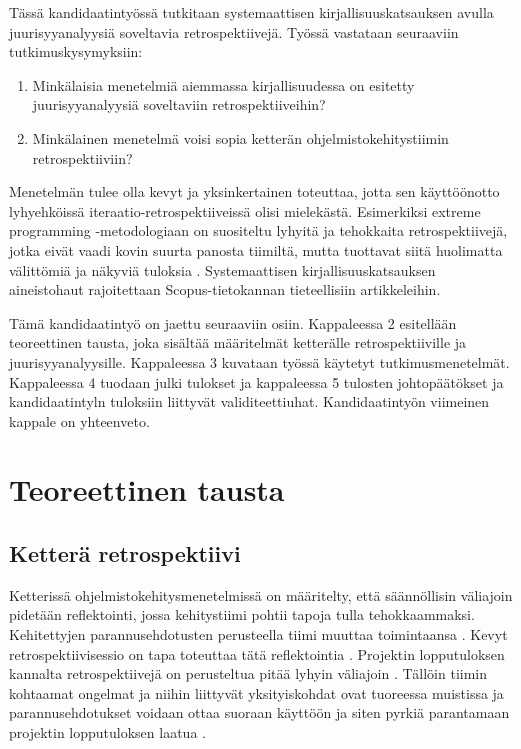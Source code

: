 Tässä kandidaatintyössä tutkitaan systemaattisen kirjallisuuskatsauksen \citep{Kitchenham2010} avulla juurisyyanalyysiä soveltavia retrospektiivejä. Työssä vastataan seuraaviin tutkimuskysymyksiin:
\begin{enumerate}
\item Minkälaisia menetelmiä aiemmassa kirjallisuudessa on esitetty juurisyyanalyysiä soveltaviin retrospektiiveihin?
\item Minkälainen menetelmä voisi sopia ketterän ohjelmistokehitystiimin retrospektiiviin?
\end{enumerate}
Menetelmän tulee olla kevyt ja yksinkertainen toteuttaa, jotta sen käyttöönotto lyhyehköissä iteraatio-retrospektiiveissä olisi mielekästä. Esimerkiksi extreme programming -metodologiaan on suositeltu lyhyitä ja tehokkaita retrospektiivejä, jotka eivät vaadi kovin suurta panosta tiimiltä, mutta tuottavat siitä huolimatta välittömiä ja näkyviä tuloksia \citep{myllyaho2004review}. Systemaattisen kirjallisuuskatsauksen aineistohaut rajoitettaan Scopus-tietokannan tieteellisiin artikkeleihin.

Tämä kandidaatintyö on jaettu seuraaviin osiin. Kappaleessa 2 esitellään teoreettinen tausta, joka sisältää määritelmät ketterälle retrospektiiville ja juurisyyanalyysille. Kappaleessa 3 kuvataan työssä käytetyt tutkimusmenetelmät. Kappaleessa 4 tuodaan julki tulokset ja kappaleessa 5 tulosten johtopäätökset ja kandidaatintyln tuloksiin liittyvät validiteettiuhat. Kandidaatintyön viimeinen kappale on yhteenveto.

\section{Teoreettinen tausta}

\subsection{Ketterä retrospektiivi}
Ketterissä ohjelmistokehitysmenetelmissä on määritelty, että säännöllisin väliajoin pidetään reflektointi, jossa kehitystiimi pohtii tapoja tulla tehokkaammaksi. Kehitettyjen parannusehdotusten perusteella tiimi muuttaa toimintaansa \citep{AgileManifestoPrinciples}. Kevyt retrospektiivisessio on tapa toteuttaa tätä reflektointia \citep{Cockburn2002}. Projektin lopputuloksen kannalta retrospektiivejä on perusteltua pitää lyhyin väliajoin \citep{Cockburn2002}. Tällöin tiimin kohtaamat ongelmat ja niihin liittyvät yksityiskohdat ovat tuoreessa muistissa ja parannusehdotukset voidaan ottaa suoraan käyttöön ja siten pyrkiä parantamaan projektin lopputuloksen laatua \citep{Cockburn2002}.

